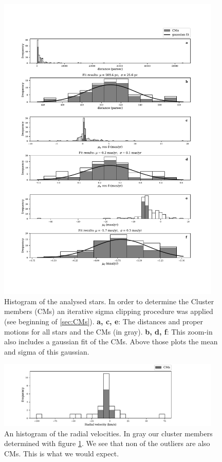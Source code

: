 \documentclass{article}
\begin{document}
\begin{figure}[H]
  \centering
    \includegraphics[trim={0 3.4cm 0 2.9cm},clip,width=0.95\textwidth]{M34_histogram_all.pdf}
  \caption{Histogram of the analysed stars. In order to determine the Cluster members (CMs) an iterative sigma clipping procedure was applied (see beginning of \ref{sec:CMs}). \textbf{a, c, e}: The distances and proper motions for all stars and the CMs (in gray). \textbf{b, d, f}: This zoom-in also includes a gaussian fit of the CMs. Above those plots the mean and sigma of this gaussian.}
  \label{fig:M34_histogram_all}
\end{figure}

\begin{figure}[H]
  \centering
    \includegraphics[trim={0 0 2cm 0},clip,width=0.95\textwidth]{M34_histogram_RV.pdf}
  \caption{An histogram of the radial velocities. In gray our cluster members determined with figure \ref{fig:M34_histogram_all}. We see that non of the outliers are also CMs. This is what we would expect.}
  \label{fig:M34_histogram_RV}
\end{figure}
\end{document}
